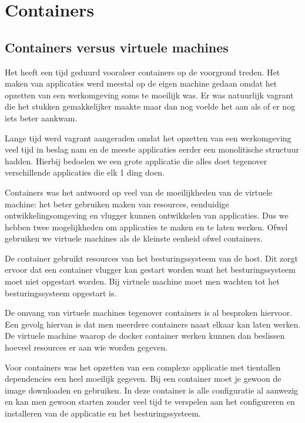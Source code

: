 \documentclass[pdftex,a4paper,12pt,twoside]{report}
\begin{document}
\chapter{Containers}
\label{ch:Containers}

\section{Containers versus virtuele machines}

Het heeft een tijd geduurd vooraleer containers op de voorgrond treden. Het maken van applicaties werd meestal op de eigen machine gedaan omdat het opzetten van een werkomgeving soms te moeilijk was. Er was natuurlijk vagrant die het stukken gemakkelijker maakte maar dan nog voelde het aan als of er nog iets beter aankwam. 

Lange tijd werd vagrant aangeraden omdat het opzetten van een werkomgeving veel tijd in beslag nam en de meeste applicaties eerder een monolitische structuur hadden. Hierbij bedoelen we een grote applicatie die alles doet tegenover verschillende applicaties die elk 1 ding doen.

Containers was het antwoord op veel van de moeilijkheden van de virtuele machine: het beter gebruiken maken van resources, eenduidige ontwikkelingsomgeving en vlugger kunnen ontwikkelen van applicaties. Dus we hebben twee mogelijkheden om applicaties te maken en te laten werken. Ofwel gebruiken we virtuele machines als de kleinste eenheid ofwel containers.

De container gebruikt resources van het besturingssysteem van de host. Dit zorgt ervoor dat een container vlugger kan gestart worden want het besturingssysteem moet niet opgestart worden. Bij virtuele machine moet men wachten tot het besturingssysteem opgestart is. 

De omvang van virtuele machines tegenover containers is al besproken hiervoor. Een gevolg hiervan is dat men meerdere containers naast elkaar kan laten werken. De virtuele machine waarop de docker container werken kunnen dan beslissen hoeveel resources er aan wie worden gegeven.

Voor containers was het opzetten van een complexe applicatie met tientallen dependencies een heel moeilijk gegeven. Bij een container moet je gewoon de image downloaden en gebruiken. In deze container is alle configuratie al aanwezig en kan men gewoon starten zonder veel tijd te verspelen aan het configureren en installeren van de applicatie en het besturingssysteem.
\end{document}
